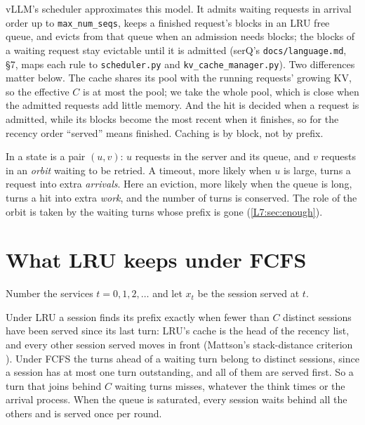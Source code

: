 vLLM's scheduler approximates this model. It admits waiting requests in arrival
order up to \texttt{max\_num\_seqs}, keeps a finished request's blocks in an LRU free
queue, and evicts from that queue when an admission needs blocks; the blocks of a waiting
request stay evictable until it is admitted (serQ's \texttt{docs/language.md}, \S7, maps
each rule to \texttt{scheduler.py} and \texttt{kv\_cache\_manager.py}). Two differences
matter below. The cache shares its pool with the running requests' growing KV, so the
effective $C$ is at most the pool; we take the whole pool, which is close when the
admitted requests add little memory. And the hit is decided when a request is admitted, while its
blocks become the most recent when it finishes, so for the recency order ``served'' means
finished. Caching is by block, not by prefix.

\begin{remark}\label{L7:rem:alvaro}
In \cite{alvaro2025} a state is a pair $(u,v)$: $u$ requests in the server and its
queue, and $v$ requests in an \emph{orbit} waiting to be retried. A timeout, more likely
when $u$ is large, turns a request into extra \emph{arrivals}. Here an eviction, more
likely when the queue is long, turns a hit into extra \emph{work}, and the number of
turns is conserved. The role of the orbit is taken by the waiting turns whose prefix is
gone (\cref{L7:sec:enough}).
\end{remark}

\section{What LRU keeps under FCFS}\label{L7:sec:lru}

Number the services $t=0,1,2,\dots$ and let $x_t$ be the session served at $t$.

Under LRU a session finds its prefix exactly when fewer than $C$ distinct sessions have
been served since its last turn: LRU's cache is the head of the recency list, and every
other session served moves in front (Mattson's stack-distance criterion
\cite{mattson1970}). Under FCFS the turns ahead of a waiting turn belong to distinct
sessions, since a session has at most one turn outstanding, and all of them are served
first. So a turn that joins behind $C$ waiting turns misses, whatever the think times or
the arrival process. When the queue is saturated, every session
waits behind all the others and is served once per round.

